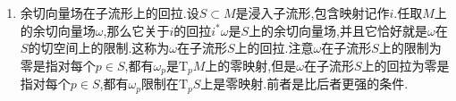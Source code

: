 \begin{enumerate}
\begin{proof}
    	任取点$p\in M$,任取$F(p)$的光滑坐标卡$(V,(y^j))$,那么$U=F^{-1}(V)$是$p$的开邻域.把$\omega$写作局部表示$\sum_j\omega_j\mathrm{d}y^j$,那么$\omega_j$都是$V$上的连续函数.按照上一条的公式得到如下等式,于是$\omega$的连续性和光滑性都可以传递给$F^*\omega$.
    	$$F^*\omega=F^*(\sum_j\omega_j\mathrm{d}y^j)=\sum_j(\omega_j\circ F)F^*\mathrm{d}y^j=\sum_j(\omega_j\circ F)\mathrm{d}(y^j\circ F)$$
    \end{proof}
    \item 余切向量场在子流形上的回拉.设$S\subset M$是浸入子流形,包含映射记作$i$.任取$M$上的余切向量场$\omega$,那么它关于$i$的回拉$i^*\omega$是$S$上的余切向量场,并且它恰好就是$\omega$在$S$的切空间上的限制.这称为$\omega$在子流形$S$上的回拉.注意$\omega$在子流形$S$上的限制为零是指对每个$p\in S$,都有$\omega_p$是$\mathrm{T}_pM$上的零映射,但是$\omega$在子流形$S$上的回拉为零是指对每个$p\in S$,都有$\omega_p$限制在$\mathrm{T}_pS$上是零映射.前者是比后者更强的条件.
\end{enumerate}


